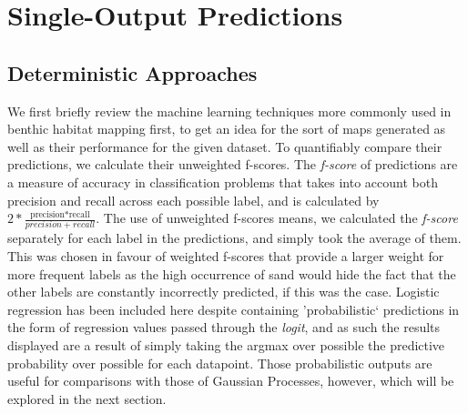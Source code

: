 % 


\section{Single-Output Predictions}

\subsection{Deterministic Approaches}

We first briefly review the machine learning techniques more commonly used in benthic habitat mapping first, to get an idea for the sort of maps generated as well as their performance for the given dataset. To quantifiably compare their predictions, we calculate their unweighted f-scores. The \textit{f-score} of predictions are a measure of accuracy in classification problems that takes into account both precision and recall across each possible label, and is calculated by $2*\frac{\text{precision*recall}}{precision+recall}$. The use of unweighted f-scores means, we calculated the \textit{f-score} separately for each label in the predictions, and simply took the average of them. This was chosen in favour of weighted f-scores that provide a larger weight for more frequent labels as the high occurrence of sand would hide the fact that the other labels are constantly incorrectly predicted, if this was the case. Logistic regression has been included here despite containing 'probabilistic` predictions in the form of regression values passed through the \textit{logit}, and as such the results displayed are a result of simply taking the argmax over possible the predictive probability over possible for each datapoint. Those probabilistic outputs are useful for comparisons with those of Gaussian Processes, however, which will be explored in the next section. 

